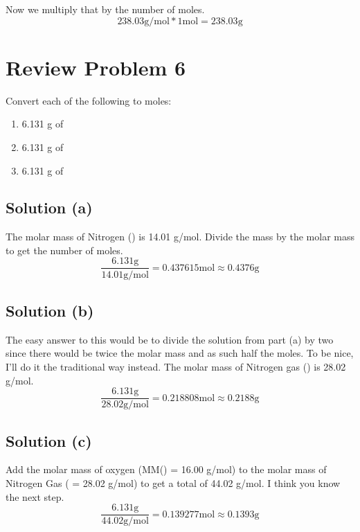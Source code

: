 \documentclass[10pt]{article}
\begin{document}
            Now we multiply that by the number of moles.
            \begin{equation}
                238.03 \unit{\gram/\mol} * 1 \unit{\mol}    =   \boxed{238.03 \unit{\gram}}
            \end{equation}
    
    \pagebreak
    \section{Review Problem 6}
        Convert each of the following to moles:
        \begin{enumerate}[label=\alph*)]
            \item 6.131 g of  
            \item 6.131 g of  
            \item 6.131 g of 
        \end{enumerate}

        \subsection{Solution (a)}
            The molar mass of Nitrogen () is 14.01 \unit{\gram/\mol}.
            Divide the mass by the molar mass to get the number of moles.
            \begin{equation}
                \frac{6.131 \unit{\gram}}{14.01 \unit{\gram/\mol}} = 0.437615 \unit{\mol} \approx \boxed{0.4376 \unit{\gram}}
            \end{equation}

        \subsection{Solution (b)}
            The easy answer to this would be to divide the solution from part (a) by two since there would be twice the molar mass and as such half the moles.
            To be nice, I'll do it the traditional way instead.
            The molar mass of Nitrogen gas () is 28.02 \unit{\gram/\mol}.
            \begin{equation}
                \frac{6.131 \unit{\gram}}{28.02 \unit{\gram/\mol}} = 0.218808 \unit{\mol}   \approx \boxed{0.2188 \unit{\gram}}
            \end{equation} 

        \subsection{Solution (c)}
            Add the molar mass of oxygen (MM() = 16.00 \unit{\gram/\mol}) to the molar mass of Nitrogen Gas ( = 28.02 \unit{\gram/\mol}) to get a total of 44.02 \unit{\gram/\mol}.
            I think you know the next step.
            \begin{equation}
                \frac{6.131 \unit{\gram}}{44.02 \unit{\gram/\mol}} = 0.139277 \unit{\mol} \approx   \boxed{0.1393 \unit{\gram}}
            \end{equation}
    
\end{document}
